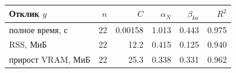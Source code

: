 \begin{tabular}{lrrrrr}
\toprule
Отклик $y$ & $n$ & $C$ & $\alpha_N$ & $\beta_{ka}$ & $R^2$\\
\midrule
полное время, с & 22 & 0.00158 & 1.013 & 0.443 & 0.975\\
RSS, МиБ & 22 & 12.2 & 0.415 & 0.125 & 0.940\\
прирост VRAM, МиБ & 22 & 25.3 & 0.338 & 0.331 & 0.962\\
\bottomrule
\end{tabular}
